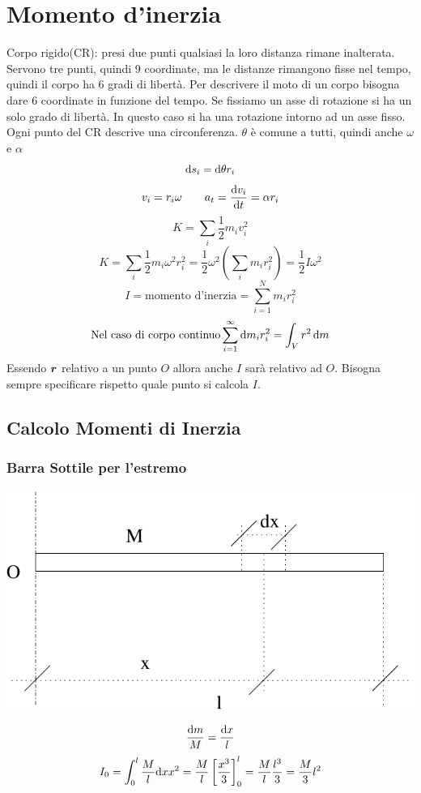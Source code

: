 \section{Momento d'inerzia}
Corpo rigido(CR): presi due punti qualsiasi la loro distanza
rimane inalterata. Servono tre punti, quindi 9 coordinate, ma le
distanze rimangono fisse nel tempo, quindi il corpo ha 6 gradi di
libertà. Per descrivere il moto di un corpo bisogna dare 6
coordinate in funzione del tempo. Se fissiamo un asse di rotazione
si ha un solo grado di libertà. In questo caso si ha una rotazione
intorno ad un asse fisso. Ogni punto del CR descrive una
circonferenza. $\theta$ è comune a tutti, quindi anche $\omega$ e
$\alpha$
\[\mathrm{d} s_i=\mathrm{d} \theta r_i\]
\[v_i=r_i\omega \qquad a_t=\frac{\mathrm{d} v_i}{\mathrm{d} t}=\alpha r_i\]
\[K=\sum_i\frac{1}{2}m_iv_i^2\]
\[K=\sum_i\frac{1}{2}m_i\omega^2r_i^2=\frac{1}{2}\omega^2\left(\sum_im_ir_i^2\right)=\frac{1}{2}I\omega^2\]
\[I=\text{momento d'inerzia}=\sum_{i=1}^N m_ir_i^2\]
\[\text{Nel caso di corpo continuo} \sum_{i=1}^\infty \mathrm{d} m_ir_i^2=\int_V  r^2\,\mathrm{d} m\]
Essendo $\boldsymbol{r}$ relativo a un punto $O$ allora anche $I$ sarà relativo ad $O$. Bisogna sempre specificare rispetto quale punto si calcola $I$.

\subsection{Calcolo Momenti di Inerzia}

\begin{minipage}[c]{\textwidth}
  \subsubsection{Barra Sottile per l'estremo}

  \centering
  \includegraphics[scale=0.4]{immagini/fisica1/sbarra_sottile1}

  \[\frac{\mathrm{d} m}{M}=\frac{\mathrm{d} x}{l}\]
  \[I_0=\int_0^l\frac{M}{l}\mathrm{d} x x^2=\frac{M}{l}\left[\frac{x^3}{3}\right]_0^l=\frac{M}{l}\frac{l^3}{3}=\frac{M}{3}l^2\]
\end{minipage}

